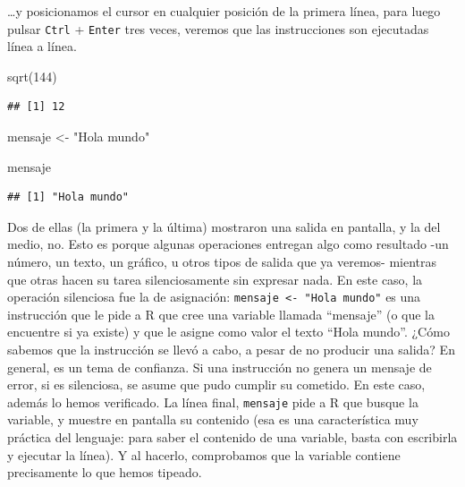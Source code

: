 \documentclass[
]{book}
\newenvironment{Shaded}{\begin{snugshade}}{\end{snugshade}}
\newcommand{\DecValTok}[1]{\textcolor[rgb]{0.00,0.00,0.81}{#1}}
\newcommand{\FunctionTok}[1]{\textcolor[rgb]{0.00,0.00,0.00}{#1}}
\newcommand{\NormalTok}[1]{#1}
\newcommand{\OtherTok}[1]{\textcolor[rgb]{0.56,0.35,0.01}{#1}}
\newcommand{\StringTok}[1]{\textcolor[rgb]{0.31,0.60,0.02}{#1}}
\begin{document}
\ldots y posicionamos el cursor en cualquier posición de la primera línea, para luego pulsar \texttt{Ctrl} + \texttt{Enter} tres veces, veremos que las instrucciones son ejecutadas línea a línea.

\begin{Shaded}
\begin{Highlighting}[]
\FunctionTok{sqrt}\NormalTok{(}\DecValTok{144}\NormalTok{)}
\end{Highlighting}
\end{Shaded}

\begin{verbatim}
## [1] 12
\end{verbatim}

\begin{Shaded}
\begin{Highlighting}[]
\NormalTok{mensaje }\OtherTok{\textless{}{-}} \StringTok{"Hola mundo"}
\end{Highlighting}
\end{Shaded}

\begin{Shaded}
\begin{Highlighting}[]
\NormalTok{mensaje}
\end{Highlighting}
\end{Shaded}

\begin{verbatim}
## [1] "Hola mundo"
\end{verbatim}

Dos de ellas (la primera y la última) mostraron una salida en pantalla, y la del medio, no. Esto es porque algunas operaciones entregan algo como resultado -un número, un texto, un gráfico, u otros tipos de salida que ya veremos- mientras que otras hacen su tarea silenciosamente sin expresar nada. En este caso, la operación silenciosa fue la de asignación: \texttt{mensaje\ \textless{}-\ "Hola\ mundo"} es una instrucción que le pide a R que cree una variable llamada ``mensaje'' (o que la encuentre si ya existe) y que le asigne como valor el texto ``Hola mundo''. ¿Cómo sabemos que la instrucción se llevó a cabo, a pesar de no producir una salida? En general, es un tema de confianza. Si una instrucción no genera un mensaje de error, si es silenciosa, se asume que pudo cumplir su cometido. En este caso, además lo hemos verificado. La línea final, \texttt{mensaje} pide a R que busque la variable, y muestre en pantalla su contenido (esa es una característica muy práctica del lenguaje: para saber el contenido de una variable, basta con escribirla y ejecutar la línea). Y al hacerlo, comprobamos que la variable contiene precisamente lo que hemos tipeado.
\end{document}
